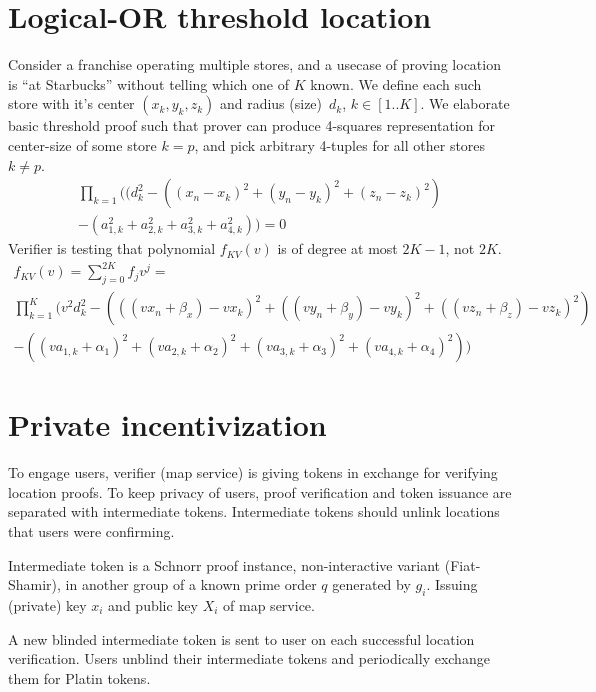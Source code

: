 \documentclass[a4paper,12pt]{article}
\begin{document}
\section{Logical-OR threshold location}

Consider a franchise operating multiple stores,
and a usecase of proving location is ``at Starbucks'' without telling which one of $K$ known.
We define each such store with it's center $(x_k, y_k, z_k)$ and radius (size)~$d_k$, $k \in [1 .. K]$.
We elaborate basic threshold proof such that prover can produce
4-squares representation for center-size of some store $k=p$,
and pick arbitrary 4-tuples for all other stores $k \ne p$.
\begin{multline}
\label{eq-distn-or}
  \prod_{k=1}
    ((d_k^2 - ((x_n - x_k)^2 + (y_n - y_k)^2 + (z_n - z_k)^2) \\
     - (a_{1, k}^2 + a_{2, k}^2 + a_{3, k}^2 + a_{4, k}^2)) = 0
\end{multline}
Verifier is testing that polynomial $f_{KV}(v)$ is of degree at most $2K-1$, not $2K$.
\begin{multline}
  f_{KV}(v) = \sum_{j=0}^{2K} f_j v^j = \\
  \prod_{k=1}^{K} (
    v^2 d_k^2 - (((v x_n + \beta_x) - v x_k)^2 +
               ((v y_n + \beta_y) - v y_k)^2 +
               ((v z_n + \beta_z) - v z_k)^2)  \\
        - ((v a_{1,k} + \alpha_1)^2 +
           (v a_{2,k} + \alpha_2)^2 +
           (v a_{3,k} + \alpha_3)^2 +
           (v a_{4,k} + \alpha_4)^2) )
\end{multline}

\section{Private incentivization}

To engage users, verifier (map service) is giving tokens in exchange for verifying location proofs.
To keep privacy of users, proof verification and token issuance are separated with intermediate tokens.
Intermediate tokens should unlink locations that users were confirming.

Intermediate token is a Schnorr proof instance, non-interactive variant (Fiat-Shamir),
in another group of a known prime order $q$ generated by $g_i$.
Issuing (private) key $x_i$ and public key $X_i$ of map service.

A new blinded intermediate token is sent to user on each successful location verification.
Users unblind their intermediate tokens and periodically exchange them for Platin tokens.
\end{document}
